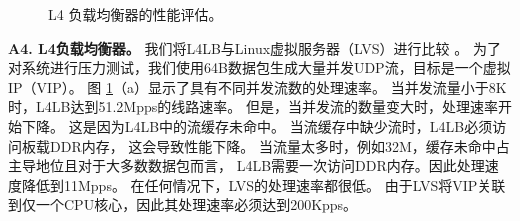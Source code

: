 \begin{figure}[htbp]
	\centering
	


	\caption{L4 负载均衡器的性能评估。}
	\label{clicknp:fig:l4}

\end{figure}


\textbf {A4. L4负载均衡器。}
我们将L4LB与Linux虚拟服务器（LVS）进行比较 \cite {lvs}。
为了对系统进行压力测试，我们使用64B数据包生成大量并发UDP流，目标是一个虚拟IP（VIP）。
图 \ref {clicknp:fig:l4}（a）显示了具有不同并发流数的处理速率。
当并发流量小于8K时，L4LB达到51.2Mpps的线路速率。
但是，当并发流的数量变大时，处理速率开始下降。
这是因为L4LB中的流缓存未命中。
当流缓存中缺少流时，L4LB必须访问板载DDR内存，
这会导致性能下降。
当流量太多时，例如32M，缓存未命中占主导地位且对于大多数数据包而言，
L4LB需要一次访问DDR内存。因此处理速度降低到11Mpps。
在任何情况下，LVS的处理速率都很低。
由于LVS将VIP关联到仅一个CPU核心，因此其处理速率必须达到200Kpps。

